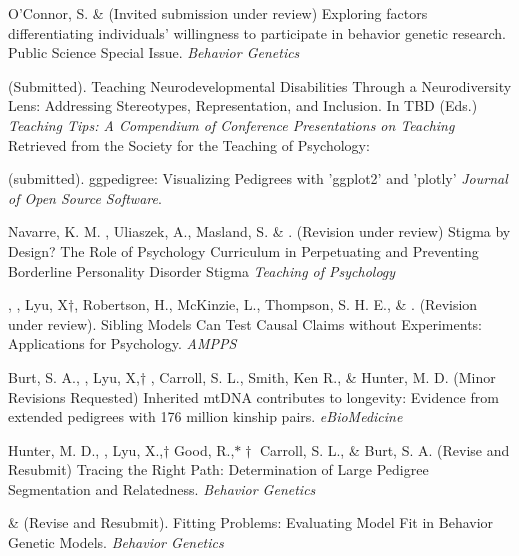 \begin{etaremune}
\item O'Connor, S. \& \meb (Invited submission under review) Exploring factors differentiating individuals’ willingness to participate in behavior genetic research. Public Science Special Issue. \textit{Behavior Genetics}
\item \meb (Submitted). Teaching Neurodevelopmental Disabilities Through a Neurodiversity Lens: Addressing Stereotypes, Representation, and Inclusion.  In TBD  (Eds.) \textit{Teaching Tips: A Compendium of Conference Presentations on Teaching} Retrieved from the Society for the Teaching of Psychology: \href{http://teachpsych.org/ebooks/}{\small\color{blue}{teachpsych.org/ebooks/}}

\item \meb  (submitted). ggpedigree: Visualizing Pedigrees with 'ggplot2' and 'plotly' \textit{Journal of Open Source Software}. \href{https://joss.theoj.org/papers/e5116b83b03e2740960d1153c45f9480}{\small\color{blue}{submission}}



\item Navarre, K. M. \noteB, Uliaszek, A., Masland, S. \& \meb. (Revision under review) Stigma by Design? The Role of Psychology Curriculum in Perpetuating and Preventing Borderline Personality Disorder Stigma \textit{Teaching of Psychology}

\item \meb, \jt, Lyu, X$\dagger$, Robertson, H.\noteA, McKinzie, L.\noteA, Thompson, S. H. E.\noteA, \& \joe. (Revision under review). Sibling Models Can Test Causal Claims without Experiments: Applications for Psychology. \href{https://osf.io/zpdwt/}{\small\color{blue}{osf.io/zpdwt/}} \textit{AMPPS} %

\item Burt, S. A., \meb, Lyu, X,$\dagger$ \joe, Carroll, S. L., Smith, Ken R., \& Hunter, M. D. (Minor Revisions Requested) Inherited mtDNA contributes to longevity: Evidence from extended pedigrees with 176 million kinship pairs. \textit{eBioMedicine}%

\item Hunter, M. D., \meb, Lyu, X.,$\dagger$ Good, R.,$*\dagger$ Carroll, S. L., \& Burt, S. A. (Revise and Resubmit) Tracing the Right Path: Determination of Large Pedigree Segmentation and Relatedness. \textit{Behavior Genetics}


\item \meb \& \joe (Revise and Resubmit). Fitting Problems: Evaluating Model Fit in Behavior Genetic Models. \textit{Behavior Genetics}  \href{https://doi.org/10.31234/osf.io/qys83}{\small\color{blue}{10.31234/osf.io/qys83}}
\end{etaremune}
